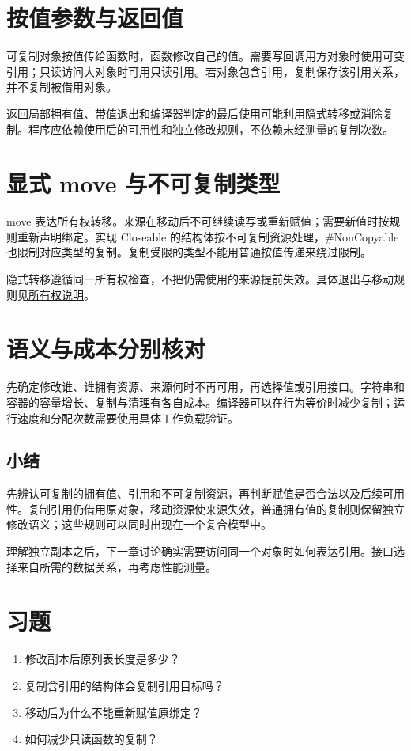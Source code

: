 \section{按值参数与返回值}

可复制对象按值传给函数时，函数修改自己的值。需要写回调用方对象时使用可变引用；只读访问大对象时可用只读引用。若对象包含引用，复制保存该引用关系，并不复制被借用对象。

返回局部拥有值、带值退出和编译器判定的最后使用可能利用隐式转移或消除复制。程序应依赖使用后的可用性和独立修改规则，不依赖未经测量的复制次数。

\section{显式 move 与不可复制类型}

move 表达所有权转移。来源在移动后不可继续读写或重新赋值；需要新值时按规则重新声明绑定。实现 Closeable 的结构体按不可复制资源处理，\#NonCopyable 也限制对应类型的复制。复制受限的类型不能用普通按值传递来绕过限制。

隐式转移遵循同一所有权检查，不把仍需使用的来源提前失效。具体退出与移动规则见\href{https://github.com/rabbitc999/ChaLi/blob/master/doc/24-ownership-move.md}{所有权说明}。

\section{语义与成本分别核对}

先确定修改谁、谁拥有资源、来源何时不再可用，再选择值或引用接口。字符串和容器的容量增长、复制与清理有各自成本。编译器可以在行为等价时减少复制；运行速度和分配次数需要使用具体工作负载验证。

\subsection*{小结}

先辨认可复制的拥有值、引用和不可复制资源，再判断赋值是否合法以及后续可用性。复制引用仍借用原对象，移动资源使来源失效，普通拥有值的复制则保留独立修改语义；这些规则可以同时出现在一个复合模型中。

理解独立副本之后，下一章讨论确实需要访问同一个对象时如何表达引用。接口选择来自所需的数据关系，再考虑性能测量。

\section{习题}

\begin{enumerate}

\item 修改副本后原列表长度是多少？

\item 复制含引用的结构体会复制引用目标吗？

\item 移动后为什么不能重新赋值原绑定？

\item 如何减少只读函数的复制？

\end{enumerate}

